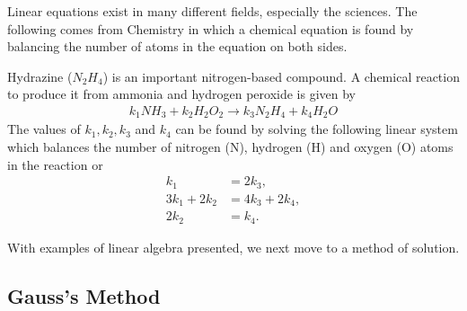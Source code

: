 Linear equations exist in many different fields, especially the sciences.  The following comes from Chemistry in which a chemical equation is found by balancing the number of atoms in the equation on both sides.

\begin{example} \label{ex:hydrazine}
Hydrazine ($N_2H_4$)  is an important nitrogen-based com\-pound.  A chemical reaction to produce it from ammonia and hydrogen peroxide is given by
%
\begin{align*}
k_1 NH_3 + k_2 H_2O_2 \rightarrow k_3 N_2 H_4 + k_4 H_2 O
\end{align*}
%
The values of $k_1, k_2, k_3$ and $k_4$ can be found by solving the following linear system which balances the number of nitrogen (N), hydrogen (H) and oxygen (O) atoms in the reaction or
%
\begin{align*}
k_1 & = 2k_3, \\
3k_1 + 2k_2 & = 4k_3 + 2k_4, \\
2k_2 & = k_4.
\end{align*}
\end{example}

With examples of linear algebra presented, we next move to a method of solution.

\subsection{Gauss's Method}

